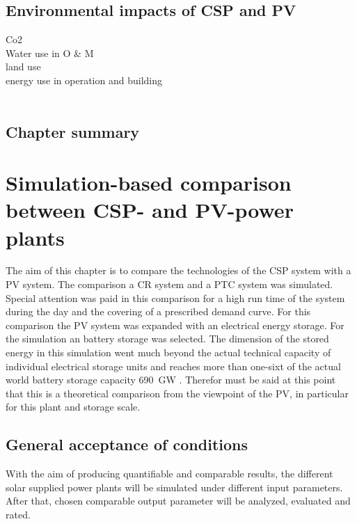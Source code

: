 \documentclass[Master,MEE,english]{twbook}%
\begin{document}
\section{Environmental impacts of CSP and PV}
Co2\\
Water use in O \& M\\
land use\\
energy use in operation and building
\cite{EASAC2011}\\
\cite{Caldes2012} \\
\section{Chapter summary}

\pagebreak
\chapter{Simulation-based comparison between CSP- and PV-power plants}
The aim of this chapter is to compare the technologies of the CSP system with a PV system. The comparison a CR system and a PTC system was simulated. Special attention was paid in this comparison for a high run time of the system during the day and the covering of a prescribed demand curve. For this comparison the PV system was expanded with an electrical energy storage. For the simulation an battery storage was selected. The dimension of the stored energy in this simulation went much beyond the actual technical capacity of individual electrical storage units and reaches more than one-sixt of the actual world battery storage capacity 690~GW \cite{IEA2015}. Therefor must be said at this point that this is a theoretical comparison from the viewpoint of the PV, in particular for this plant and storage scale.
\pagebreak
\section{General acceptance of conditions}
With the aim of producing quantifiable and comparable results, the different solar supplied power plants will be simulated under different input  parameters. After that, chosen comparable output parameter will be analyzed, evaluated and rated.
\end{document}
